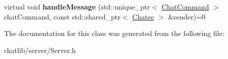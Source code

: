 \begin{DoxyCompactItemize}
\item 
\hypertarget{classSimpleChat_1_1Server_a39468217b57290fc663b8874ac9fdf26}{virtual void {\bfseries handle\-Message} (std\-::unique\-\_\-ptr$<$ \hyperlink{classSimpleChat_1_1ChatCommand}{Chat\-Command} $>$ chat\-Command, const std\-::shared\-\_\-ptr$<$ \hyperlink{classSimpleChat_1_1Chatee}{Chatee} $>$ \&sender)=0}\label{classSimpleChat_1_1Server_a39468217b57290fc663b8874ac9fdf26}

\end{DoxyCompactItemize}


The documentation for this class was generated from the following file\-:\begin{DoxyCompactItemize}
\item 
chatlib/server/Server.\-h\end{DoxyCompactItemize}
